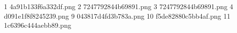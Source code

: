 1 4a91b133f6a332df.png
2 7247792844b69891.png
3 7247792844b69891.png
4 d091e1f8f8245239.png
9 043817d4fd3b783a.png
10 f5de82880c5bb4af.png
11 1c6396c444aebb89.png
